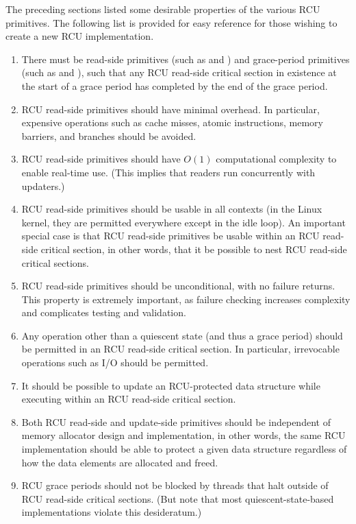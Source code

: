 The preceding sections listed some desirable properties of the
various RCU primitives.
The following list is provided for easy reference for those wishing to
create a new RCU implementation.

\begin{enumerate}
\item	There must be read-side primitives (such as 
	and ) and grace-period primitives
	(such as  and ), such
	that any RCU read-side critical section in existence at the
	start of a grace period has completed by the end of the
	grace period.
\item	RCU read-side primitives should have minimal overhead.
	In particular, expensive operations such as cache misses,
	atomic instructions, memory barriers, and branches should
	be avoided.
\item	RCU read-side primitives should have $O\left(1\right)$ computational
	complexity to enable real-time use.
	(This implies that readers run concurrently with updaters.)
\item	RCU read-side primitives should be usable in all contexts
	(in the Linux kernel, they are permitted everywhere except in
	the idle loop).
	An important special case is that RCU read-side primitives be
	usable within an RCU read-side critical section, in other words,
	that it be possible to nest RCU read-side critical sections.
\item	RCU read-side primitives should be unconditional, with no
	failure returns.
	This property is extremely important, as failure checking
	increases complexity and complicates testing and validation.
\item	Any operation other than a quiescent state (and thus a grace
	period) should be permitted in an RCU read-side critical section.
	In particular, irrevocable operations such as I/O should be
	permitted.
\item	It should be possible to update an RCU-protected data structure
	while executing within an RCU read-side critical section.
\item	Both RCU read-side and update-side primitives should be independent
	of memory allocator design and implementation, in other words,
	the same RCU implementation should be able to protect a given
	data structure regardless of how the data elements are allocated
	and freed.
\item	RCU grace periods should not be blocked by threads that
	halt outside of RCU read-side critical sections.
	(But note that most quiescent-state-based implementations
	violate this desideratum.)
\end{enumerate}

